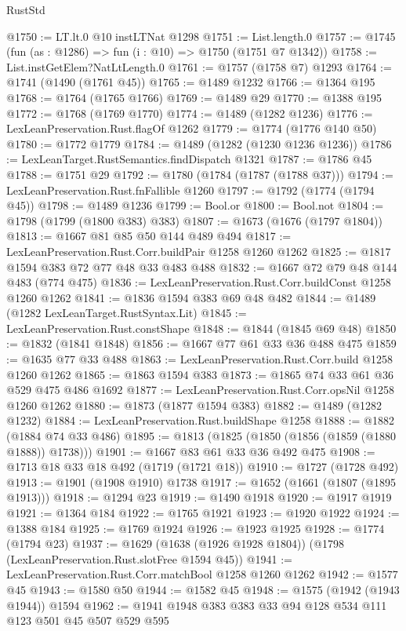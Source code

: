\begin{lexlean}{RustStd}
\begin{coremodule}
@1750 := LT.lt.{0} @10 instLTNat @1298
@1751 := List.length.{0}
@1757 := @1745 (fun (as : @1286) => fun (i : @10) => @1750 (@1751 @7 @1342))
@1758 := List.instGetElem?NatLtLength.{0}
@1761 := @1757 (@1758 @7) @1293
@1764 := @1741 (@1490 (@1761 @45))
@1765 := @1489 @1232
@1766 := @1364 @195
@1768 := @1764 (@1765 @1766)
@1769 := @1489 @29
@1770 := @1388 @195
@1772 := @1768 (@1769 @1770)
@1774 := @1489 (@1282 @1236)
@1776 := LexLeanPreservation.Rust.flagOf @1262
@1779 := @1774 (@1776 @140 @50)
@1780 := @1772 @1779
@1784 := @1489 (@1282 (@1230 @1236 @1236))
@1786 := LexLeanTarget.RustSemantics.findDispatch @1321
@1787 := @1786 @45
@1788 := @1751 @29
@1792 := @1780 (@1784 (@1787 (@1788 @37)))
@1794 := LexLeanPreservation.Rust.fnFallible @1260
@1797 := @1792 (@1774 (@1794 @45))
@1798 := @1489 @1236
@1799 := Bool.or
@1800 := Bool.not
@1804 := @1798 (@1799 (@1800 @383) @383)
@1807 := @1673 (@1676 (@1797 @1804))
@1813 := @1667 @81 @85 @50 @144 @489 @494
@1817 := LexLeanPreservation.Rust.Corr.buildPair @1258 @1260 @1262
@1825 := @1817 @1594 @383 @72 @77 @48 @33 @483 @488
@1832 := @1667 @72 @79 @48 @144 @483 (@774 @475)
@1836 := LexLeanPreservation.Rust.Corr.buildConst @1258 @1260 @1262
@1841 := @1836 @1594 @383 @69 @48 @482
@1844 := @1489 (@1282 LexLeanTarget.RustSyntax.Lit)
@1845 := LexLeanPreservation.Rust.constShape
@1848 := @1844 (@1845 @69 @48)
@1850 := @1832 (@1841 @1848)
@1856 := @1667 @77 @61 @33 @36 @488 @475
@1859 := @1635 @77 @33 @488
@1863 := LexLeanPreservation.Rust.Corr.build @1258 @1260 @1262
@1865 := @1863 @1594 @383
@1873 := @1865 @74 @33 @61 @36 @529 @475 @486 @1692
@1877 := LexLeanPreservation.Rust.Corr.opsNil @1258 @1260 @1262
@1880 := @1873 (@1877 @1594 @383)
@1882 := @1489 (@1282 @1232)
@1884 := LexLeanPreservation.Rust.buildShape @1258
@1888 := @1882 (@1884 @74 @33 @486)
@1895 := @1813 (@1825 (@1850 (@1856 (@1859 (@1880 @1888)) @1738)))
@1901 := @1667 @83 @61 @33 @36 @492 @475
@1908 := @1713 @18 @33 @18 @492 (@1719 (@1721 @18))
@1910 := @1727 (@1728 @492)
@1913 := @1901 (@1908 @1910) @1738
@1917 := @1652 (@1661 (@1807 (@1895 @1913)))
@1918 := @1294 @23
@1919 := @1490 @1918
@1920 := @1917 @1919
@1921 := @1364 @184
@1922 := @1765 @1921
@1923 := @1920 @1922
@1924 := @1388 @184
@1925 := @1769 @1924
@1926 := @1923 @1925
@1928 := @1774 (@1794 @23)
@1937 := @1629 (@1638 (@1926 @1928 @1804)) (@1798 (LexLeanPreservation.Rust.slotFree @1594 @45))
@1941 := LexLeanPreservation.Rust.Corr.matchBool @1258 @1260 @1262
@1942 := @1577 @45
@1943 := @1580 @50
@1944 := @1582 @45
@1948 := @1575 (@1942 (@1943 @1944)) @1594
@1962 := @1941 @1948 @383 @383 @33 @94 @128 @534 @111 @123 @501 @45 @507 @529 @595

\end{coremodule}
\end{lexlean}
